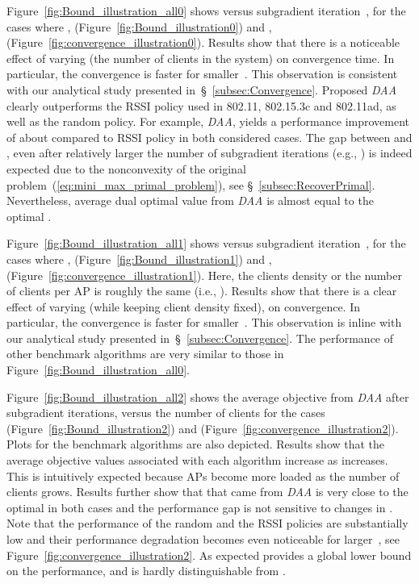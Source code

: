 \documentclass[journal, 10pt, twocolumn]{IEEEtran}
\begin{document}
Figure~\ref{fig:Bound_illustration_all0} shows  versus subgradient iteration~, for the cases where ,  (Figure~\ref{fig:Bound_illustration0}) and ,  (Figure~\ref{fig:convergence_illustration0}). Results show that there is a noticeable effect of varying  (the number of clients in the system) on convergence time. In particular, the convergence is faster for smaller~. This observation is consistent with our analytical study presented in~\S~\ref{subsec:Convergence}. Proposed \emph{DAA} clearly outperforms the RSSI policy used in 802.11, 802.15.3c and 802.11ad, as well as the random policy. For example, \emph{DAA}, yields a performance improvement of about  compared to RSSI policy in both considered cases. The gap between  and , even after relatively larger the number of subgradient iterations (e.g., ) is indeed expected due to the nonconvexity of the original problem~(\ref{eq:mini_max_primal_problem}), see \S~\ref{subsec:RecoverPrimal}. Nevertheless, average dual optimal value  from \emph{DAA} is almost equal to the optimal .


Figure~\ref{fig:Bound_illustration_all1} shows  versus subgradient iteration~, for the cases where ,  (Figure~\ref{fig:Bound_illustration1}) and ,  (Figure~\ref{fig:convergence_illustration1}). Here, the clients density or the number of clients per AP is roughly the same (i.e., ). Results show that there is a clear effect of varying  (while keeping client density fixed), on convergence. In particular, the convergence is faster for smaller~. This observation is inline with our analytical study presented in~\S~\ref{subsec:Convergence}. The performance of other benchmark algorithms are very similar to those in Figure~\ref{fig:Bound_illustration_all0}.





Figure~\ref{fig:Bound_illustration_all2} shows the average objective from \emph{DAA} after  subgradient iterations,  versus the number of clients  for the cases  (Figure~\ref{fig:Bound_illustration2}) and  (Figure~\ref{fig:convergence_illustration2}). Plots for the benchmark algorithms are also depicted. Results show that the average objective values associated with each algorithm increase as  increases. This is intuitively expected because APs become more loaded as the number of clients grows. Results further show that  that came from \emph{DAA} is very close to the optimal  in both cases and the performance gap is not sensitive to changes in . Note that the performance of the random and the RSSI policies are substantially low and their performance degradation becomes even noticeable for larger~, see Figure~\ref{fig:convergence_illustration2}. As expected  provides a global lower bound on the performance, and is hardly distinguishable from .
\end{document}

